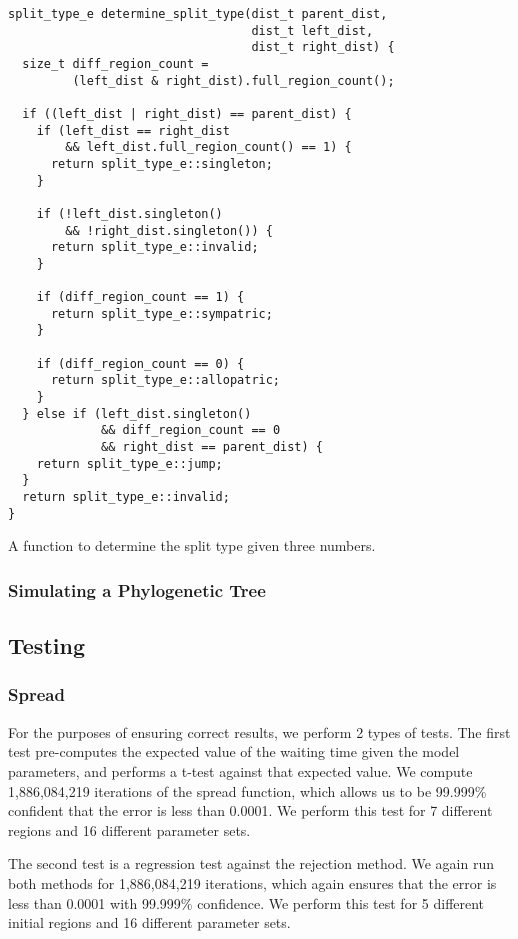 \documentclass[a4paper]{article}
\begin{document}
\begin{listing}
	\begin{verbatim}
split_type_e determine_split_type(dist_t parent_dist, 
                                  dist_t left_dist, 
                                  dist_t right_dist) {
  size_t diff_region_count =
         (left_dist & right_dist).full_region_count();

  if ((left_dist | right_dist) == parent_dist) {
    if (left_dist == right_dist 
        && left_dist.full_region_count() == 1) {
      return split_type_e::singleton;
    }

    if (!left_dist.singleton() 
        && !right_dist.singleton()) {
      return split_type_e::invalid;
    }

    if (diff_region_count == 1) {
      return split_type_e::sympatric;
    }

    if (diff_region_count == 0) {
      return split_type_e::allopatric;
    }
  } else if (left_dist.singleton()
             && diff_region_count == 0
             && right_dist == parent_dist) {
    return split_type_e::jump;
  }
  return split_type_e::invalid;
}
\end{verbatim}
	\caption{A function to determine the split type given three numbers.}
	\label{lst:determine-split-type}
\end{listing}

\subsubsection{Simulating a Phylogenetic Tree}


\subsection{Testing}

\subsubsection{Spread}

For the purposes of ensuring correct results, we perform 2 types of tests.
The first test pre-computes the expected value of the waiting time given the
model parameters, and performs a t-test against that expected value.
We compute 1,886,084,219 iterations of the spread function, which allows us to
be 99.999\% confident that the error is less than 0.0001.
We perform this test for 7 different regions and 16 different parameter sets.

The second test is a regression test against the rejection method.
We again run both methods for 1,886,084,219 iterations, which again ensures
that the error is less than 0.0001 with 99.999\% confidence.
We perform this test for 5 different initial regions and 16 different parameter
sets.
\end{document}
